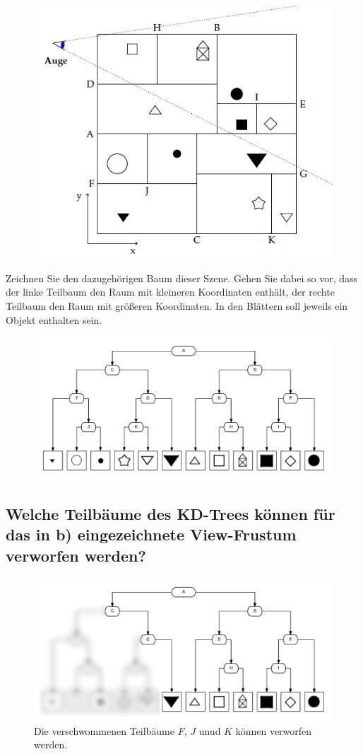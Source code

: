 \documentclass[a4paper,10pt,DIV=14]{scrartcl}
\begin{document}
\begin{figure}[!htbp]
	\centering
	\includegraphics[]{scene}
\end{figure}

Zeichnen Sie den dazugehörigen Baum dieser Szene. Gehen Sie dabei so vor, dass der linke Teilbaum den Raum mit kleineren Koordinaten enthält, der rechte Teilbaum den Raum mit größeren Koordinaten. In den Blättern soll jeweils ein Objekt enthalten sein.

\begin{figure}[!htbp]
	\centering
	\includegraphics[width=1\linewidth]{kd}
\end{figure}

\newpage
\subsection{Welche Teilbäume des KD-Trees können für das in b) eingezeichnete View-Frustum verworfen werden?}

\begin{figure}[!htbp]
	\centering
	\includegraphics[width=1\linewidth]{kd_blur}
	\caption*{Die verschwommenen Teilbäume $F$, $J$ unud $K$ können verworfen werden.}
\end{figure}
\end{document}
